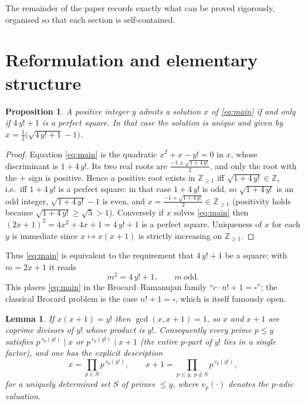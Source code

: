 \documentclass{amsart}
\theoremstyle{plain}
\newtheorem{proposition}{Proposition}
\newtheorem{lemma}{Lemma}
\theoremstyle{remark}
\begin{document}
The remainder of the paper records exactly what can be proved rigorously,
organised so that each section is self-contained.

\section{Reformulation and elementary structure}

\begin{proposition}\label{prop:square}
A positive integer $y$ admits a solution $x$ of \eqref{eq:main} if and only
if $4\,y!+1$ is a perfect square.  In that case the solution is unique and
given by $x=\tfrac{1}{2}\bigl(\sqrt{4\,y!+1}-1\bigr)$.
\end{proposition}

\begin{proof}
Equation \eqref{eq:main} is the quadratic $x^2+x-y!=0$ in $x$, whose
discriminant is $1+4\,y!$.  Its two real roots are
$\frac{-1\pm\sqrt{1+4\,y!}}{2}$, and only the root with the $+$ sign is
positive.  Hence a positive root exists in $\mathbb{Z}_{\ge1}$ iff
$\sqrt{1+4\,y!}\in\mathbb{Z}$, i.e.\ iff $1+4\,y!$ is a perfect square: in
that case $1+4\,y!$ is odd, so $\sqrt{1+4\,y!}$ is an odd integer,
$\sqrt{1+4\,y!}-1$ is even, and
$x=\frac{-1+\sqrt{1+4\,y!}}{2}\in\mathbb{Z}_{\ge 1}$ (positivity holds
because $\sqrt{1+4\,y!}\ge\sqrt 5>1$).  Conversely if $x$ solves
\eqref{eq:main} then $(2x+1)^2=4x^2+4x+1=4\,y!+1$ is a perfect square.
Uniqueness of $x$ for each $y$ is immediate since $x\mapsto x(x+1)$ is
strictly increasing on $\mathbb{Z}_{\ge 1}$.
\end{proof}

Thus \eqref{eq:main} is equivalent to the requirement that $4\,y!+1$ be a
square; with $m=2x+1$ it reads
\begin{equation}\label{eq:m}
   m^2=4\,y!+1,\qquad m\ \text{odd}.
\end{equation}
This places \eqref{eq:main} in the Brocard--Ramanujan family
``$c\cdot n!+1=\square$''; the classical Brocard problem is the case
$n!+1=\square$, which is itself famously open.

\begin{lemma}\label{lem:coprime}
If $x(x+1)=y!$ then $\gcd(x,x+1)=1$, so $x$ and $x+1$ are coprime divisors
of $y!$ whose product is $y!$.  Consequently every prime $p\le y$ satisfies
$p^{\,v_p(y!)}\mid x$ or $p^{\,v_p(y!)}\mid x+1$ (the entire $p$-part of $y!$
lies in a single factor), and one has the explicit description
\begin{equation}\label{eq:coprimedesc}
   x=\prod_{p\in S}p^{\,v_p(y!)},\qquad
   x+1=\prod_{p\le y,\;p\notin S}p^{\,v_p(y!)},
\end{equation}
for a uniquely determined set $S$ of primes $\le y$, where $v_p(\cdot)$
denotes the $p$-adic valuation.
\end{lemma}
\end{document}
